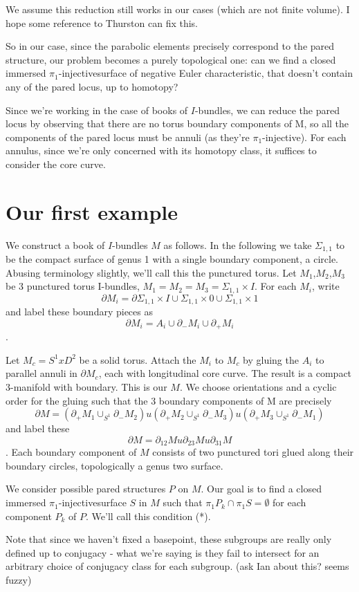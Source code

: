 \documentclass[12pt]{amsart}
\theoremstyle{definition}
\newcommand{\x}{\times}
\newcommand{\bd}{\partial}
\newcommand{\Si}{\Sigma}
\newcommand{\piinj}{$\pi_1$-injective}
\begin{document}
We assume this reduction still works in our cases (which are not finite
volume). I hope some reference to Thurston can fix this.

So in our case, since the parabolic elements precisely correspond to the pared
structure, our problem becomes a purely topological one: can we find a closed
immersed \piinj surface of negative Euler characteristic, that
doesn't contain any of the pared locus, up to homotopy?

Since we're working in the case of books of $I$-bundles, we can reduce the pared
locus by observing that there are no torus boundary components of M, so all the
components of the pared locus must be annuli (as they're \piinj). For
each annulus, since we're only concerned with its homotopy class, it suffices
to consider the core curve.

\section{Our first example}

We construct a book of $I$-bundles $M$ as follows. In the following we take
$\Si_{1,1}$ to be the compact surface of genus 1 with a single boundary
component, a circle.  Abusing terminology slightly, we'll call this the
punctured torus.  Let $M_1$,$M_2$,$M_3$ be 3 punctured torus I-bundles,
$M_1=M_2=M_3=\Si_{1,1}\x I$. For each $M_i$, write
\[
\bd M_i = \bd \Si_{1,1}\x I \cup \Si_{1,1}\x0 \cup \Si_{1,1} \x 1
\]
and label these boundary pieces as
\[
\bd M_i = A_i \cup \bd_- M_i \cup \bd_+M_i
\].

Let $M_c = S^1xD^2$ be a solid torus. Attach the $M_i$ to $M_c$ by gluing the
$A_i$ to parallel annuli in $\bd M_c$, each with longitudinal core curve. The
result is a compact 3-manifold with boundary. This is our $M$. We choose
orientations and a cyclic order for the gluing such that the 3 boundary
components of M are precisely
\[
\bd M = (\bd_+M_1 \cup_{S^1} \bd_-M_2) u (\bd_+M_2 \cup_{S^1} \bd_-M_3)
u (\bd_+M_3 \cup_{S^1} \bd_-M_1)
\]
and label these
\[
\bd M=\bd_{12}M u \bd_{23}Mu \bd_{31}M
\].
Each boundary
component of $M$ consists of two punctured tori glued along their boundary
circles, topologically a genus two surface.

We consider possible pared structures $P$ on $M$. Our goal is to find a closed
immersed \piinj surface $S$ in $M$ such that $\pi_1P_k \cap \pi_1S
= \emptyset$
for each component $P_k$ of $P$. We'll call this condition (*).

Note that since we
haven't fixed a basepoint, these subgroups are really only defined up to
conjugacy - what we're saying is they fail to intersect for an arbitrary choice
of conjugacy class for each subgroup. (ask Ian about this? seems fuzzy)
\end{document}
